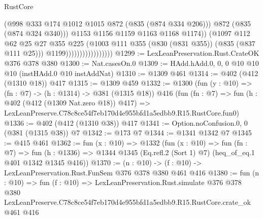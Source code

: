 \begin{lexlean}{RustCore}
\begin{coremodule}
                                          (@998 @333 @174 @1012 @1015 @872 (@835 (@874 @334 @206)))
                                          @872
                                          (@835 (@874 @324 @340)))
                                        @1153
                                        @1156
                                        @1159
                                        @1163
                                        @1168
                                        @1174))
                                    (@1097
                                      @112
                                      @62
                                      @25
                                      @27
                                      @355
                                      @225
                                      (@1003 @111 @355 (@830 (@831 @355)) (@835 (@837 @111 @25)))
                                      @1199)))))))))))))))))
@1299 := LexLeanPreservation.Rust.CrateOK @376 @378 @380
@1300 := Nat.casesOn.{0}
@1309 := HAdd.hAdd.{0, 0, 0} @10 @10 @10 (instHAdd.{0} @10 instAddNat)
@1310 := @1309 @461
@1314 := @402 (@412 (@1310 @18)) @417
@1315 := @1309 @459
@1332 := @1300
    (fun (y : @10) => (fn : @7) -> (h : @1314) -> @381 (@1315 @18))
    @416
    (fun (fn : @7) =>
    fun (h : @402 (@412 (@1309 Nat.zero @18)) @417) =>
    LexLeanPreserve.C78c8ce54f7eb170d4e955bfd1a5edbb9.R15.RustCore.fun0)
@1336 := @402 (@412 (@1310 @38)) @417
@1341 := Option.noConfusion.{0, 0} (@381 (@1315 @38)) @7
@1342 := @173 @7
@1344 := @1341 @1342 @7
@1345 := @415 @461
@1362 := fun (x : @10) =>
  @1332
    (fun (x : @10) =>
    fun (fn : @7) =>
    fun (h : @1336) => @1344 @1345 (Eq.refl.{2} (Sort 1) @7) (heq_of_eq.{1} @401 @1342 @1345 @416))
@1370 := (n : @10) -> (f : @10) -> LexLeanPreservation.Rust.FunSem @376 @378 @380 @461 @416
@1380 := fun (n : @10) =>
  fun (f : @10) =>
  LexLeanPreservation.Rust.simulate
    @376
    @378
    @380
    LexLeanPreserve.C78c8ce54f7eb170d4e955bfd1a5edbb9.R15.RustCore.crate_ok
    @461
    @416
\end{coremodule}
\end{lexlean}
